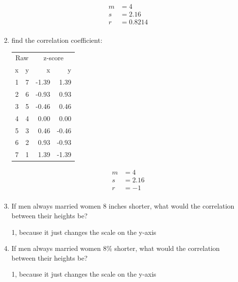 \documentclass{exam}
\begin{document}
\begin{enumerate}
    \begin{solution}
      \begin{align*}
        m &= 4 \\
        s &= 2.16 \\
        r &= 0.8214 \\
      \end{align*}
    \end{solution}

    \item find the correlation coefficient:
      \begin{table}[ht]
      \centering
      \begin{tabular}{rrrr}
        \toprule
        \multicolumn{2}{c}{Raw} & \multicolumn{2}{c}{z-score } \\
        \cmidrule(r){1-2} \cmidrule(r){3-4} 
        x & y & x     & y \\
        \midrule
        1 & 7 & -1.39 & 1.39 \\ 
        2 & 6 & -0.93 & 0.93 \\ 
        3 & 5 & -0.46 & 0.46 \\ 
        4 & 4 & 0.00 & 0.00 \\ 
        5 & 3 & 0.46 & -0.46 \\ 
        6 & 2 & 0.93 & -0.93 \\ 
        7 & 1 & 1.39 & -1.39 \\ 
        \bottomrule
      \end{tabular}
      \end{table}

    \begin{solution}
      \begin{align*}
        m &= 4 \\
        s &= 2.16 \\
        r &= -1 \\
      \end{align*}
    \end{solution}

    \item If men always married women 8 inches shorter, what would the correlation
      between their heights be?
      
      \begin{solution}
        1, because it just changes the scale on the y-axis
      \end{solution}

    \item If men always married women 8\% shorter, what would the correlation
      between their heights be?
      \begin{solution}
        1, because it just changes the scale on the y-axis
      \end{solution}


\end{enumerate}
\end{document}
